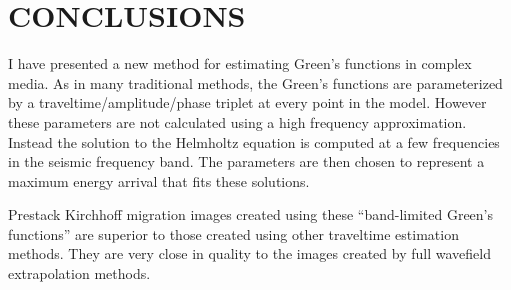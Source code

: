 

\section{CONCLUSIONS}

I have presented a new method for estimating Green's functions in
complex media. As in many traditional methods, the Green's functions
are parameterized by a traveltime/amplitude/phase triplet at every
point in the model. However these parameters are not calculated using
a high frequency approximation. Instead the solution to the Helmholtz
equation is computed at a few frequencies in the seismic frequency
band. The parameters are then chosen to represent a maximum energy
arrival that fits these solutions.

Prestack Kirchhoff migration images created using these ``band-limited
Green's functions'' are superior to those created using other
traveltime estimation methods. They are very close in quality to the
images created by full wavefield extrapolation methods.




